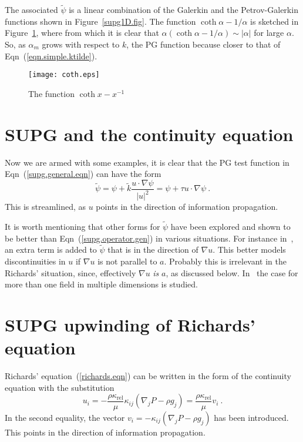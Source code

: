 \documentclass[]{scrreprt}
\begin{document}
The associated
$\tilde{\psi}$ is a linear combination of the Galerkin and the
Petrov-Galerkin functions shown in Figure~\ref{supg1D.fig}.  The function
$\coth\alpha - 1/\alpha$ is sketched in Figure~\ref{coth.fig}, where
from which it is clear that $\alpha(\coth\alpha - 1/\alpha) \sim
|\alpha|$ for large $\alpha$.  So, as $\alpha_{m}$ grows with respect to
$k$, the PG function because closer to that of Eqn~(\ref{eqn.simple.ktilde}).

\begin{figure}[htb]
\centering
\texttt{[image: coth.eps]}
\caption{The function $\coth x - x^{-1}$}
\label{coth.fig}
\end{figure}


\section{SUPG and the continuity equation}

Now we are armed with some examples, it is clear that the PG test
function in Eqn~(\ref{supg.general.eqn}) can have the form
\begin{equation}
\tilde{\psi} = \psi + \tilde{k} \frac{u\cdot\nabla\psi}{|u|^{2}} =
\psi + \tau u\cdot\nabla\psi \ .
\label{supg.operator.gen}
\end{equation}
This is streamlined, as $u$ points in the direction of information
propagation.


It is worth mentioning that other forms for $\tilde{\psi}$ have been
explored and shown to be better than Eqn~(\ref{supg.operator.gen}) in
various situations.  For instance in~\cite{hughesET1986}, an extra
term is added to $\tilde{\psi}$ that is in the direction of $\nabla
u$.  This better models discontinuities in $u$ if $\nabla u$ is not
parallel to $a$.  Probably this is irrelevant in the Richards'
situation, since, effectively $\nabla u$ {\em is} $a$, as discussed
below.  In~\cite{hughes1986} the case for more than one field in
multiple dimensions is studied.


\section{SUPG upwinding of Richards' equation}

Richards' equation~(\ref{richards.eqn}) can be written in the form of
the continuity equation  with the substitution
\begin{equation}
u_{i} = -\frac{\rho\kappa_{\mathrm{rel}}}{\mu}\kappa_{ij}(\nabla_{j}P
- \rho g_{j}) = \frac{\rho\kappa_{\mathrm{rel}}}{\mu}v_{i}\ .
\end{equation}
In the second equality, the vector $v_{i} = -\kappa_{ij}(\nabla_{j}P -
\rho g_{j})$ has been introduced.  This points in the direction of
information propagation.
\end{document}
